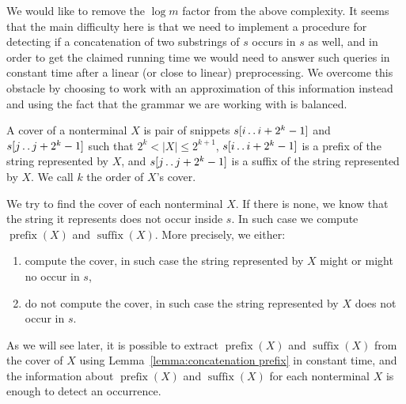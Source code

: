 \documentclass[runningheads]{llncs}
\DeclareMathOperator{\prefix}{prefix}
\DeclareMathOperator{\suffix}{suffix}
\newcommand{\twodots}{\mathinner{\ldotp\ldotp}}
\begin{document}
We would like to remove the $\log m$ factor from the above complexity. It seems that the main difficulty here is that we need to implement a procedure
for detecting if a concatenation of two substrings of $s$ occurs in $s$ as well, and in order to get the claimed running time we would need to answer such queries in constant time after a linear (or close to linear) preprocessing. We overcome this obstacle by choosing to work with an approximation of this information instead and using the fact that the grammar we are working with is balanced.

\begin{definition}
A cover of a nonterminal $X$ is pair of snippets $s[i\twodots i+2^k-1]$ and $s[j\twodots j+2^k-1]$ such that $2^k<|X|\leq 2^{k+1}$, $s[i\twodots i+2^k-1]$ is a prefix of the string represented by $X$, and $s[j\twodots j+2^k-1]$ is a suffix of the string represented by $X$. We call $k$ the order of $X$'s cover.
\end{definition}

We try to find the cover of each nonterminal $X$. If there is none, we know that the string it represents does not occur inside $s$. In such case we compute $\prefix(X)$ and $\suffix(X)$. More precisely, we either:
\begin{enumerate}
\item compute the cover, in such case the string represented by $X$ might or might no occur in $s$,
\item do not compute the cover, in such case the string represented by $X$ does not occur in $s$.
\end{enumerate}
As we will see later, it is possible to extract $\prefix(X)$ and $\suffix(X)$ from the cover of $X$ using Lemma~\ref{lemma:concatenation prefix} in constant time, and the information about $\prefix(X)$ and $\suffix(X)$ for each nonterminal $X$ is enough to detect an occurrence.
\end{document}
